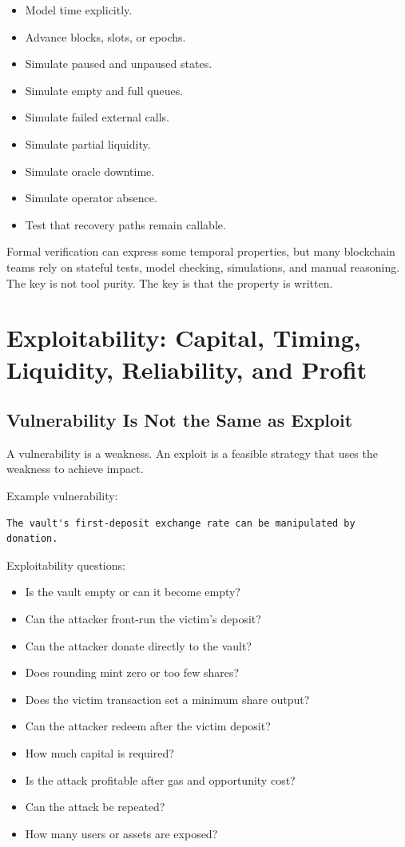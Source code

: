 \begin{itemize}
\tightlist
\item
  Model time explicitly.
\item
  Advance blocks, slots, or epochs.
\item
  Simulate paused and unpaused states.
\item
  Simulate empty and full queues.
\item
  Simulate failed external calls.
\item
  Simulate partial liquidity.
\item
  Simulate oracle downtime.
\item
  Simulate operator absence.
\item
  Test that recovery paths remain callable.
\end{itemize}

Formal verification can express some temporal properties, but many
blockchain teams rely on stateful tests, model checking, simulations,
and manual reasoning. The key is not tool purity. The key is that the
property is written.

\section{Exploitability: Capital, Timing, Liquidity, Reliability, and Profit}

\subsection{Vulnerability Is Not the Same as Exploit}

A vulnerability is a weakness. An exploit is a feasible strategy that
uses the weakness to achieve impact.

Example vulnerability:

\begin{lstlisting}
The vault's first-deposit exchange rate can be manipulated by donation.
\end{lstlisting}

Exploitability questions:

\begin{itemize}
\tightlist
\item
  Is the vault empty or can it become empty?
\item
  Can the attacker front-run the victim's deposit?
\item
  Can the attacker donate directly to the vault?
\item
  Does rounding mint zero or too few shares?
\item
  Does the victim transaction set a minimum share output?
\item
  Can the attacker redeem after the victim deposit?
\item
  How much capital is required?
\item
  Is the attack profitable after gas and opportunity cost?
\item
  Can the attack be repeated?
\item
  How many users or assets are exposed?
\end{itemize}

